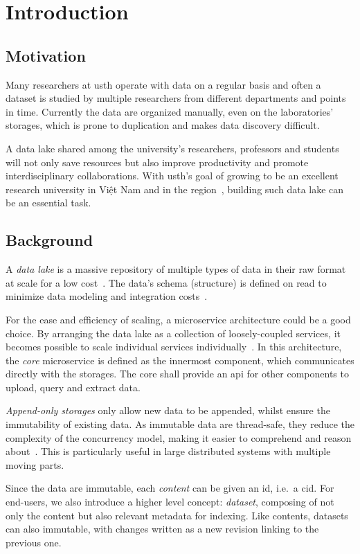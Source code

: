 \chapter{Introduction}
\section{Motivation}
Many researchers at \gls{usth} operate with data on a regular basis
and often a dataset is studied by multiple researchers from different
departments and points in time.  Currently the data are organized manually,
even on the laboratories' storages, which is prone to duplication
and makes data discovery difficult.

A data lake shared among the university's researchers, professors and students
will not only save resources but also improve productivity and promote
interdisciplinary collaborations.  With \gls{usth}'s goal of growing to be
an excellent research university in {Việt Nam}
and in the region~\cite{usth}, building such data lake can be an essential task.

\section{Background}
A \emph{data lake} is a massive repository of multiple types of data
in their raw format at scale for a low cost~\cite{lake}.
The data's schema (structure) is defined on read to minimize data modeling
and integration costs~\cite{lake}.

For the ease and efficiency of scaling, a microservice architecture
could be a good choice.  By arranging the data lake as a collection
of loosely-coupled services, it becomes possible to scale individual services
individually~\cite{micro}.  In this architecture, the \emph{core} microservice
is defined as the innermost component, which communicates directly
with the storages.  The core shall provide an \gls{api} for other components
to upload, query and extract data.

\emph{Append-only storages} only allow new data to be appended, whilst ensure
the immutability of existing data.  As immutable data are thread-safe,
they reduce the complexity of the concurrency model, making it easier
to comprehend and reason about~\cite{pure}.  This is particularly useful
in large distributed systems with multiple moving parts.

Since the data are immutable, each \emph{\gls{content}} can be given
an \gls{id}, i.e.~a \gls{cid}.  For end-users, we also introduce
a higher level concept: \emph{dataset}, composing of not only the content
but also relevant metadata for indexing.  Like contents, datasets can also
immutable, with changes written as a new revision linking to the previous one.

